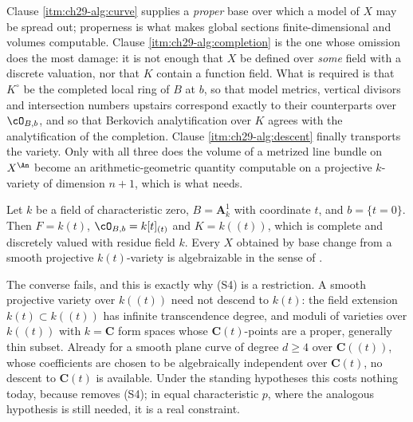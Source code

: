 \begin{remark}
\label{rem:ch29-algebraizability-clauses}
Clause \cref{itm:ch29-alg:curve} supplies a \emph{proper} base over which a
model of \(X\) may be spread out; properness is what makes global sections
finite-dimensional and volumes computable.  Clause
\cref{itm:ch29-alg:completion} is the one whose omission does the most
damage: it is not enough that \(X\) be defined over \emph{some} field with a
discrete valuation, nor that \(K\) contain a function field.  What is
required is that \(K^\circ\) be the completed local ring of \(B\) at \(b\),
so that model metrics, vertical divisors and intersection numbers upstairs
correspond exactly to their counterparts over \(\cO_{B,b}\), and so that
Berkovich analytification over \(K\) agrees with the analytification of the
completion.  Clause \cref{itm:ch29-alg:descent} finally transports the
variety.  Only with all three does the volume of a metrized line bundle on
\(X^{\An}\) become an arithmetic-geometric quantity computable on a
projective \(k\)-variety of dimension \(n+1\), which is what
\cite[Appendix~A]{BFJ15} needs.
\end{remark}

\begin{example}
\label{ex:ch29-algebraizability-instance}
Let \(k\) be a field of characteristic zero, \(B=\mathbf A^1_k\) with
coordinate \(t\), and \(b=\{t=0\}\).  Then
\(F=k(t)\), \(\cO_{B,b}=k[t]_{(t)}\) and
\(K=k(\!(t)\!)\), which is complete and discretely valued with residue field
\(k\).  Every \(X\) obtained by base change from a smooth projective
\(k(t)\)-variety is algebraizable in the sense of
.

The converse fails, and this is exactly why \textup{(S4)} is a restriction.
A smooth projective variety over \(k(\!(t)\!)\) need not descend to
\(k(t)\): the field extension \(k(t)\subset k(\!(t)\!)\) has infinite
transcendence degree, and moduli of varieties over \(k(\!(t)\!)\) with
\(k=\mathbf C\) form spaces whose \(\mathbf C(t)\)-points are a proper,
generally thin subset.  Already for a smooth plane curve of degree
\(d\geq4\) over \(\mathbf C(\!(t)\!)\), whose coefficients are chosen to be
algebraically independent over \(\mathbf C(t)\), no descent to
\(\mathbf C(t)\) is available.  Under the standing hypotheses this costs
nothing today, because  removes
\textup{(S4)}; in equal characteristic \(p\), where the analogous
hypothesis  is still needed, it is a real
constraint.
\end{example}

